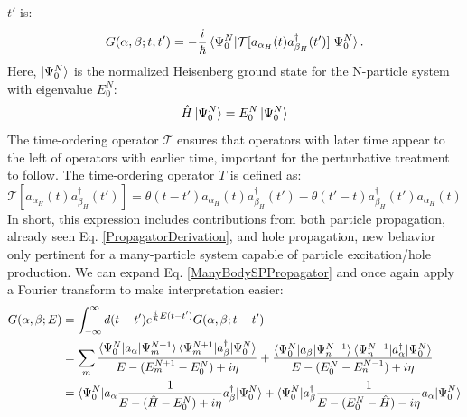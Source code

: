 $t'$ is:
\begin{equation} \label{ManyBodySPPropagator}
    G(\alpha, \beta; t, t') =
    -\frac{i}{\hbar}\braket{\Psi^{N}_{0}|\mathcal{T}
    [a_{\alpha_{H}}(t)a^{\dagger}_{\beta_{H}}(t')]|\Psi^{N}_{0}}.
\end{equation}
Here, $\ket{\Psi^{N}_{0}}$ is the normalized Heisenberg ground state for the N-particle system with
eigenvalue $E^{N}_{0}$:
\begin{equation} \label{NParticleGroundState}
    \hat{H}\ket{\Psi^{N}_{0}} = E^{N}_{0}\ket{\Psi^{N}_{0}}
\end{equation}
The time-ordering operator $\mathcal{T}$ ensures
that operators with later time appear to the left
of operators with earlier time\footnotemark, important for the perturbative treatment to follow.
\footnotetext
{
    The time-ordering operator $T$ is defined as:
    \begin{equation*}
        \mathcal{T}[a_{\alpha_{H}}(t)a^{\dagger}_{\beta_{H}}(t')]=\theta(t-t')a_{\alpha_{H}}(t)a^{\dagger}_{\beta_{H}}(t')
        -\theta(t'-t)a^{\dagger}_{\beta_{H}}(t')a_{\alpha_{H}}(t)
    \end{equation*}
}
In short, this expression includes contributions from both particle propagation, already seen 
Eq. \ref{PropagatorDerivation}, and hole propagation, new behavior only
pertinent for a many-particle system capable of particle excitation/hole production.
We can expand Eq.
\ref{ManyBodySPPropagator} and once again apply a Fourier transform to make
interpretation easier:
\begin{equation} \label{LehmannRepresentation}
    \begin{split}
        G(\alpha,\beta;E) & =
        \int_{-\infty}^{\infty}d(t-t')e^{\frac{i}{\hbar}E(t-t')}G(\alpha,\beta;t-t')\\
        & = \sum_m
        \frac{\braket{\Psi^{N}_{0}|a_{\alpha}|\Psi^{N+1}_{m}}\braket{\Psi^{N+1}_{m}|a^{\dagger}_{\beta}|\Psi^{N}_{0}}}
        {E-(E^{N+1}_{m}-E^{N}_{0})+i\eta} +
        \frac{\braket{\Psi^{N}_{0}|a_{\beta}|\Psi^{N-1}_{n}}\braket{\Psi^{N-1}_{n}|a^{\dagger}_{\alpha}|\Psi^{N}_{0}}}
        {E-(E^{N}_{0}-E^{N-1}_{n})+i\eta}\\
        & =
        \braket{\Psi^{N}_{0}|a_{\alpha}\frac{1}{E-(\hat{H}-E_{0}^{N})+i\eta}a^{\dagger}_{\beta}|\Psi^{N}_{0}} +
        \braket{\Psi^{N}_{0}|a^{\dagger}_{\beta}\frac{1}{E-(E^{N}_{0}-\hat{H})-i\eta}a_{\alpha}|\Psi^{N}_{0}}
    \end{split}
\end{equation}
